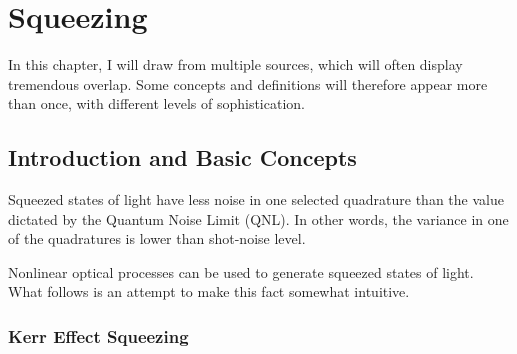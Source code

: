 \chapter{Squeezing}

In this chapter, I will draw from multiple sources, which will often display tremendous overlap. Some concepts and definitions will therefore appear more than once, with different levels of sophistication.

\section{Introduction and Basic Concepts}

Squeezed states of light have less noise in one selected quadrature than the value dictated by the Quantum Noise Limit (QNL). In other words, the variance in one of the quadratures is lower than shot-noise level.

Nonlinear optical processes can be used to generate squeezed states of light. What follows is an attempt to make this fact somewhat intuitive.

\subsection*{Kerr Effect Squeezing}

